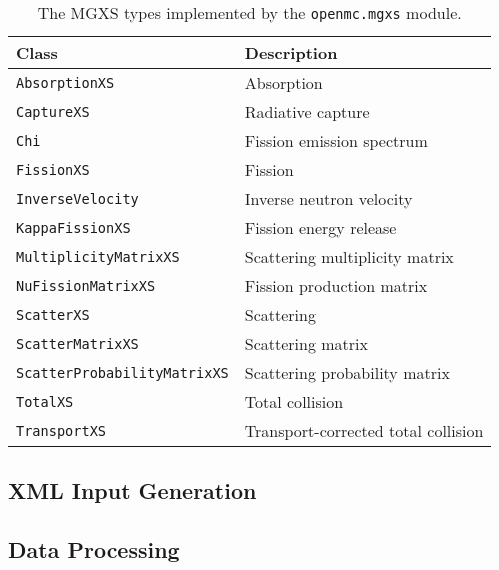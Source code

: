 \begin{table}[h!]
  \centering
  \caption{The MGXS types implemented by the \texttt{openmc.mgxs} module.}
  \small
  \label{tab:mgxs-types} 
  \vspace{6pt}
  \begin{tabular}{l p{10cm}}
  \toprule
  \textbf{Class} &
  \textbf{Description} \\
  \midrule
  \texttt{AbsorptionXS} & Absorption \\
  \texttt{CaptureXS} & Radiative capture \\
  \texttt{Chi} & Fission emission spectrum \\
  \texttt{FissionXS} & Fission \\
  \texttt{InverseVelocity} & Inverse neutron velocity \\
  \texttt{KappaFissionXS} & Fission energy release \\
  \texttt{MultiplicityMatrixXS} & Scattering multiplicity matrix \\
  \texttt{NuFissionMatrixXS} & Fission production matrix \\
  \texttt{ScatterXS} & Scattering \\
  \texttt{ScatterMatrixXS} & Scattering matrix \\
  \texttt{ScatterProbabilityMatrixXS} & Scattering probability matrix \\
  \texttt{TotalXS} & Total collision \\
  \texttt{TransportXS} & Transport-corrected total collision \\
  \bottomrule
\end{tabular}
\end{table}


\subsection{XML Input Generation}
\label{subsec:xml-inputs}


\subsection{Data Processing}
\label{subsec:xml-inputs}

